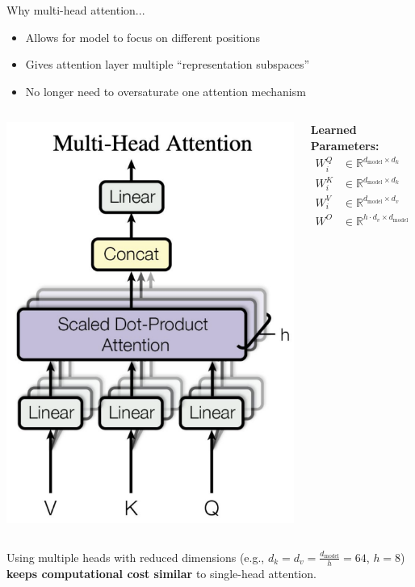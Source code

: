 \documentclass{beamer}
\begin{document}
\begin{frame}{Why multi-head attention...}

\begin{itemize}
    \item Allows for model to focus on different positions
    \item Gives attention layer multiple “representation subspaces”
    \item No longer need to oversaturate one attention mechanism
\end{itemize}

\begin{columns}
  \includegraphics[width=1\linewidth]{f14.png} %

  \textbf{Learned Parameters:}
  \begin{align*}
    W^Q_i &\in \mathbb{R}^{d_{\text{model}} \times d_k} \\
    W^K_i &\in \mathbb{R}^{d_{\text{model}} \times d_k} \\
    W^V_i &\in \mathbb{R}^{d_{\text{model}} \times d_v} \\
    W^O   &\in \mathbb{R}^{h \cdot d_v \times d_{\text{model}}}
  \end{align*}
\end{columns}

Using multiple heads with reduced dimensions (e.g., $d_k = d_v = \frac{d_{\text{model}}}{h} = 64$, $h = 8$) \textbf{keeps computational cost similar} to single-head attention.
    
\end{frame}
\end{document}
